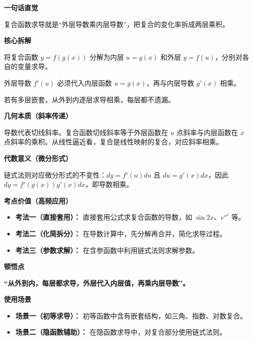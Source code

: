 \begin{explanationbox}
	\textbf{\textcolor{CExplanation}{一句话直觉}}

	复合函数求导就是“外层导数乘内层导数”，把复合的变化率拆成两层乘积。

	\medskip
	\textbf{\textcolor{CExplanation}{核心拆解}}
	\begin{description}[style=nextline, leftmargin=2.8em, labelsep=0.5em, itemsep=0.45em]
		\item[\textbf{要点一（分层求导）：}] 将复合函数 $y=f(g(x))$ 分解为内层 $u=g(x)$ 和外层 $y=f(u)$，分别对各自的变量求导。
		\item[\textbf{要点二（乘积回代）：}] 外层导数 $f'(u)$ 必须代入内层函数 $u=g(x)$，再与内层导数 $g'(x)$ 相乘。
		\item[\textbf{要点三（多层传递）：}] 若有多层嵌套，从外到内逐层求导相乘，每层都不遗漏。
	\end{description}

	\medskip
	\textbf{\textcolor{CExplanation}{几何本质（斜率传递）}}

	导数代表切线斜率。复合函数切线斜率等于外层函数在 $u$ 点斜率与内层函数在 $x$ 点斜率的乘积。从线性逼近看，复合是线性映射的复合，对应斜率相乘。

	\medskip
	\textbf{\textcolor{CExplanation}{代数意义（微分形式）}}

	链式法则对应微分形式的不变性：$dy=f'(u)du$ 且 $du=g'(x)dx$，因此 $dy=f'(g(x))g'(x)dx$，即导数相乘。

	\medskip
	\textbf{\textcolor{CExplanation}{考点价值（高频应用）}}
	\begin{itemize}[leftmargin=*, itemsep=0.5em, topsep=0.4em]
		\item \textbf{考法一（直接套用）：} 直接套用公式求复合函数的导数，如 $\sin 2x$、$e^{x^2}$ 等。
		\item \textbf{考法二（化简拆分）：} 在导数计算中，先分解再合并，简化求导过程。
		\item \textbf{考法三（参数求解）：} 在含参函数中利用链式法则求解参数。
	\end{itemize}

	\medskip
	\textbf{\textcolor{CExplanation}{顿悟点}}

	\textbf{“从外到内，每层都求导，外层代入内层值，再乘内层导数”。}

	\medskip
	\textbf{\textcolor{CExplanation}{使用场景}}
	\begin{itemize}[leftmargin=*, itemsep=0.5em, topsep=0.4em]
		\item \textbf{场景一（初等求导）：} 初等函数中含有嵌套结构，如三角、指数、对数复合。
		\item \textbf{场景二（隐函数辅助）：} 在隐函数求导中，对复合部分使用链式法则。
	\end{itemize}
\end{explanationbox}
